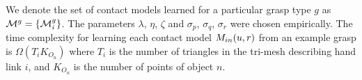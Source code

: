 We denote the set of contact models learned for a particular grasp type $g$ as $\mathcal{M}^g=\{\mathcal{M}^g_i\}$. The parameters $\lambda$, $\eta$, $\zeta$ and $\sigma_{p}$, $\sigma_{q}$, $\sigma_{r}$ were chosen empirically. The time complexity for learning each contact model $M_{in}(u, r)$ from an example grasp is $\Omega(T_i K_{O_n})$ where $T_i$ is the number of triangles in the tri-mesh describing hand link $i$, and $K_{O_n}$ is the number of points of object $n$.


%
%
